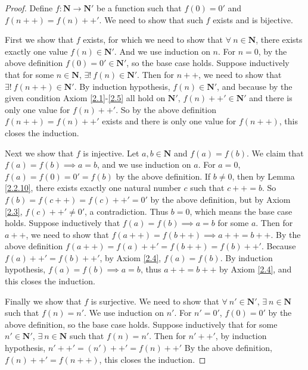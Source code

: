 \begin{proof}
    Define \(f : \mathbf{N} \to \mathbf{N}'\) be a function such that \(f(0) = 0'\) and \(f(n++) = f(n)++'\).
    We need to show that such \(f\) exists and is bijective.

    First we show that \(f\) exists, for which we need to show that \(\forall\ n \in \mathbf{N}\), there exists exactly one value \(f(n) \in \mathbf{N}'\).
    And we use induction on \(n\).
    For \(n = 0\), by the above definition \(f(0) = 0' \in \mathbf{N}'\), so the base case holds.
    Suppose inductively that for some \(n \in \mathbf{N}\), \(\exists!\ f(n) \in \mathbf{N}'\).
    Then for \(n++\), we need to show that \(\exists!\ f(n++) \in \mathbf{N}'\).
    By induction hypothesis, \(f(n) \in \mathbf{N}'\), and because by the given condition Axiom \ref{2.1}-\ref{2.5} all hold on \(\mathbf{N}'\), \(f(n)++' \in \mathbf{N}'\) and there is only one value for \(f(n)++'\).
    So by the above definition \(f(n++) = f(n)++'\) exists and there is only one value for \(f(n++)\), this closes the induction.

    Next we show that \(f\) is injective.
    Let \(a, b \in \mathbf{N}\) and \(f(a) = f(b)\).
    We claim that \(f(a) = f(b) \implies a = b\), and we use induction on \(a\).
    For \(a = 0\), \(f(a) = f(0) = 0' = f(b)\) by the above definition.
    If \(b \neq 0\), then by Lemma \ref{2.2.10}, there exists exactly one natural number \(c\) such that \(c++ = b\).
    So \(f(b) = f(c++) = f(c)++' = 0'\) by the above definition, but by Axiom \ref{2.3}, \(f(c)++' \neq 0'\), a contradiction.
    Thus \(b = 0\), which means the base case holds.
    Suppose inductively that \(f(a) = f(b) \implies a = b\) for some \(a\).
    Then for \(a++\), we need to show that \(f(a++) = f(b++) \implies a++ = b++\).
    By the above definition \(f(a++) = f(a)++' = f(b++) = f(b)++'\).
    Because \(f(a)++' = f(b)++'\), by Axiom \ref{2.4}, \(f(a) = f(b)\).
    By induction hypothesis, \(f(a) = f(b) \implies a = b\), thus \(a++ = b++\) by Axiom \ref{2.4}, and this closes the induction.

    Finally we show that \(f\) is surjective.
    We need to show that \(\forall\ n' \in \mathbf{N}'\), \(\exists\ n \in \mathbf{N}\) such that \(f(n) = n'\).
    We use induction on \(n'\).
    For \(n' = 0'\), \(f(0) = 0'\) by the above definition, so the base case holds.
    Suppose inductively that for some \(n' \in \mathbf{N}'\), \(\exists\ n \in \mathbf{N}\) such that \(f(n) = n'\).
    Then for \(n'++'\), by induction hypothesis, \(n'++' = (n')++' = f(n)++'\)
    By the above definition, \(f(n)++' = f(n++)\), this closes the induction.
\end{proof}